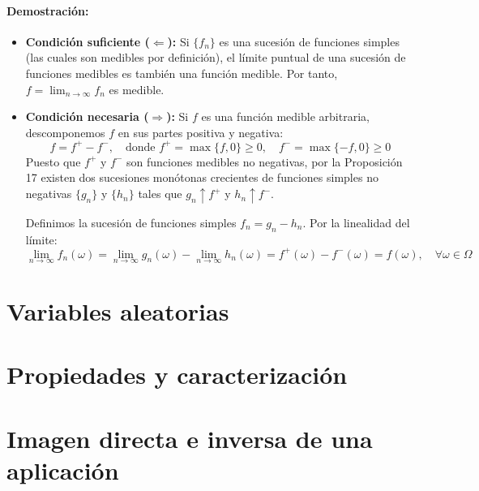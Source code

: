 \paragraph{Demostración:}
\begin{itemize}
    \item \textbf{Condición suficiente ($\Leftarrow$):} Si $\{f_n\}$ es una sucesión de funciones simples (las cuales son medibles por definición), el límite puntual de una sucesión de funciones medibles es también una función medible. Por tanto, $f = \lim_{n \to \infty} f_n$ es medible.
    
    \item \textbf{Condición necesaria ($\Rightarrow$):} Si $f$ es una función medible arbitraria, descomponemos $f$ en sus partes positiva y negativa:
    \[
        f = f^+ - f^-, \quad \text{donde } f^+ = \max\{f, 0\} \ge 0, \quad f^- = \max\{-f, 0\} \ge 0
    \]
    Puesto que $f^+$ y $f^-$ son funciones medibles no negativas, por la Proposición 17 existen dos sucesiones monótonas crecientes de funciones simples no negativas $\{g_n\}$ y $\{h_n\}$ tales que $g_n \uparrow f^+$ y $h_n \uparrow f^-$. 
    
    Definimos la sucesión de funciones simples $f_n = g_n - h_n$. Por la linealidad del límite:
    \[
        \lim_{n \to \infty} f_n(\omega) = \lim_{n \to \infty} g_n(\omega) - \lim_{n \to \infty} h_n(\omega) = f^+(\omega) - f^-(\omega) = f(\omega), \quad \forall \omega \in \Omega
    \]
\end{itemize}


\newpage
\section{Variables aleatorias}

\section{Propiedades y caracterización}

\newpage

\section{Imagen directa e inversa de una aplicación}

